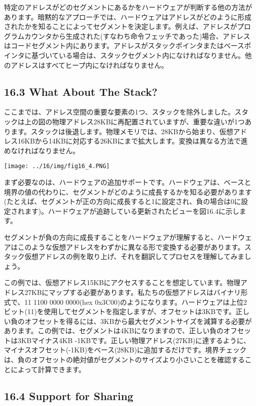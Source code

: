 特定のアドレスがどのセグメントにあるかをハードウェアが判断する他の方法があります。暗黙的なアプローチでは、ハードウェアはアドレスがどのように形成されたかを知ることによってセグメントを決定します。例えば、アドレスがプログラムカウンタから生成された(すなわち命令フェッチであった)場合、アドレスはコードセグメント内にあります。アドレスがスタックポインタまたはベースポインタに基づいている場合は、スタックセグメント内になければなりません。他のアドレスはすべてヒープ内になければなりません。

\hypertarget{what-about-the-stack}{%
\subsection*{16.3 What About The Stack?}\label{what-about-the-stack}}

ここまでは、アドレス空間の重要な要素の1つ、スタックを除外しました。スタックは上の図の物理アドレス28KBに再配置されていますが、重要な違いが1つあります。スタックは後退します。物理メモリでは、28KBから始まり、仮想アドレス16KBから14KBに対応する26KBにまで拡大します。変換は異なる方法で進めなければなりません。

\texttt{[image: ../16/img/fig16\_4.PNG]}

まず必要なのは、ハードウェアの追加サポートです。ハードウェアは、ベースと境界の値の代わりに、セグメントがどのように成長するかを知る必要があります(たとえば、セグメントが正の方向に成長すると1に設定され、負の場合は0に設定されます)。ハードウェアが追跡している更新されたビューを図16.4に示します。

セグメントが負の方向に成長することをハードウェアが理解すると、ハードウェアはこのような仮想アドレスをわずかに異なる形で変換する必要があります。スタック仮想アドレスの例を取り上げ、それを翻訳してプロセスを理解してみましょう。

この例では、仮想アドレス15KBにアクセスすることを想定しています。物理アドレス27KBにマップする必要があります。私たちの仮想アドレスはバイナリ形式で、11
1100 0000 0000(hex
0x3C00)のようになります。ハードウェアは上位2ビット(11)を使用してセグメントを指定しますが、オフセットは3KBです。正しい負のオフセットを得るには、3KBから最大セグメントサイズを減算する必要があります。この例では、セグメントは4KBになりますので、正しい負のオフセットは3KBマイナス4KB
-1KBです。正しい物理アドレス(27KB)に達するように、マイナスオフセット(-1KB)をベース(28KB)に追加するだけです。境界チェックは、負のオフセットの絶対値がセグメントのサイズより小さいことを確認することによって計算できます。

\hypertarget{support-for-sharing}{%
\subsection*{16.4 Support for Sharing}\label{support-for-sharing}}

